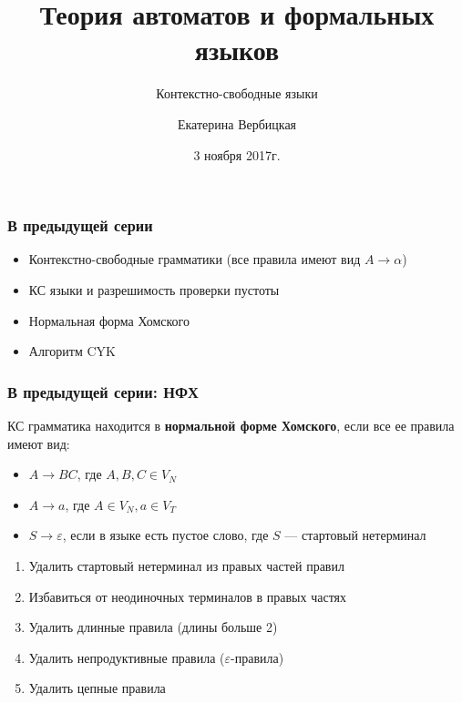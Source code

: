 \documentclass{beamer}
\title[]{Теория автоматов и формальных языков}
\subtitle[]{Контекстно-свободные языки}
\institute[]{
Санкт-Петербургский государственный электротехнический университет <<ЛЭТИ>>\\
}
\author[]{Екатерина Вербицкая}
\date{3 ноября 2017г.}
\begin{document}
{
  \begin{frame}
    \titlepage
  \end{frame}
}


\begin{frame}[fragile]
  \transwipe[direction=90]
  \frametitle{В предыдущей серии}
  \begin{itemize}
    \item Контекстно-свободные грамматики (все правила имеют вид $A \rightarrow \alpha$) 
    \item КС языки и разрешимость проверки пустоты
    \item Нормальная форма Хомского
    \item Алгоритм CYK
  \end{itemize}
\end{frame}

\begin{frame}[fragile]
  \transwipe[direction=90]
  \frametitle{В предыдущей серии: НФХ}
  КС грамматика находится в \textbf{нормальной форме Хомского}, если все ее правила имеют вид: 
  \begin{itemize}
    \item $A \rightarrow B C$, где $A,B,C \in V_N$
    \item $A \rightarrow a$, где $A \in V_N, a \in V_T$
    \item $S \rightarrow \varepsilon$, если в языке есть пустое слово, где $S$ --- стартовый нетерминал
  \end{itemize}

  \begin{enumerate}
    \item Удалить стартовый нетерминал из правых частей правил 
    \item Избавиться от неодиночных терминалов в правых частях 
    \item Удалить длинные правила (длины больше 2)
    \item Удалить непродуктивные правила ($\varepsilon$-правила)
    \item Удалить цепные правила
   \end{enumerate}
\end{frame}
\end{document}
